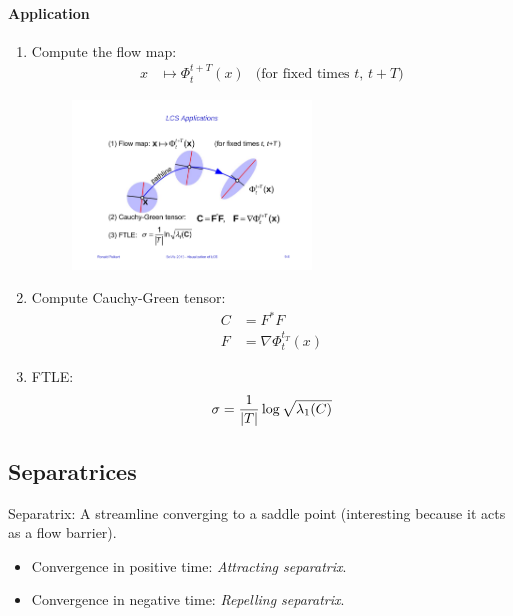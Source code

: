 \paragraph{Application}
\begin{enumerate}
    \item Compute the flow map: 
        \begin{align*}
         x&\mapsto \Phi_t^{t+T} (x) &\text{(for fixed times $t$, $t+T$)}
        \end{align*}
        \begin{figure}[H]
            \centering
            \includegraphics[width=0.6\textwidth]{img/09_lcs_application}
        \end{figure}

    \item Compute Cauchy-Green tensor:
        \begin{align*}
            C &= F^*F\\
            F &= \nabla \Phi_t^{t_T} (x)
        \end{align*}
    \item FTLE:
        \begin{align*}
             \sigma = {1\over |T|} \log \sqrt{\lambda_1(C)}
        \end{align*}
\end{enumerate}
\subsection{Separatrices}
Separatrix: A streamline converging to a saddle point (interesting because it acts as a flow barrier). 
\begin{itemize}
    \item Convergence in positive time: \emph{Attracting separatrix}.
    \item Convergence in negative time: \emph{Repelling separatrix}.
\end{itemize}

